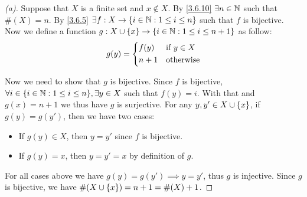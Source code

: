 \begin{proof}[(a)]
	Suppose that \(X\) is a finite set and \(x \notin X\).
	By \cref{3.6.10} \(\exists n \in \mathbb{N}\) such that \(\#(X) = n\).
	By \cref{3.6.5} \(\exists f : X \to \left\lbrace i \in \mathbb{N} : 1 \leq i \leq n\right\rbrace\) such that \(f\) is bijective.
	Now we define a function \(g : X \cup \left\lbrace x\right\rbrace \to \left\lbrace i \in \mathbb{N} : 1 \leq i \leq n + 1\right\rbrace\) as follow:
	\[
		g(y) = \begin{dcases}
			f(y)  & \text{if } y \in X \\
			n + 1 & \text{otherwise}
		\end{dcases}
	\]

	Now we need to show that \(g\) is bijective.
	Since \(f\) is bijective, \(\forall i \in \set{i \in \N : 1 \leq i \leq n}, \exists y \in X\) such that \(f(y) = i\).
	With that and \(g(x) = n + 1\) we thus have \(g\) is surjective.
	For any \(y, y' \in X \cup \left\lbrace x\right\rbrace\), if \(g(y) = g(y')\), then we have two cases:
	\begin{itemize}
		\item If \(g(y) \in X\), then \(y = y'\) since \(f\) is bijective.
		\item If \(g(y) = x\), then \(y = y' = x\) by definition of \(g\).
	\end{itemize}
	For all cases above we have \(g(y) = g(y') \implies y = y'\), thus \(g\) is injective.
	Since \(g\) is bijective, we have \(\#(X \cup \left\lbrace x\right\rbrace) = n + 1 = \#(X) + 1\).
\end{proof}

